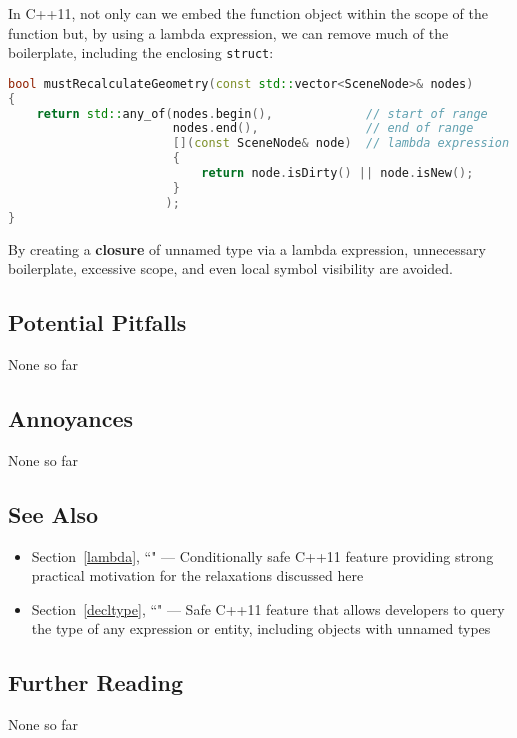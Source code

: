 \noindent In C++11, not only can we embed the function object within the scope of
the function but, by using a lambda expression, we can
remove much of the boilerplate, including the enclosing \texttt{struct}:

\begin{lstlisting}[language=C++]
bool mustRecalculateGeometry(const std::vector<SceneNode>& nodes)
{
    return std::any_of(nodes.begin(),             // start of range
                       nodes.end(),               // end of range
                       [](const SceneNode& node)  // lambda expression
                       {
                           return node.isDirty() || node.isNew();
                       }
                      );
}
\end{lstlisting}
    
\noindent By creating a \textbf{closure} of unnamed type via a lambda
expression, unnecessary boilerplate, excessive scope, and even local
symbol visibility are avoided.

\subsection[Potential Pitfalls]{Potential Pitfalls}\label{potential-pitfalls}

None so far

\subsection[Annoyances]{Annoyances}\label{annoyances}

None so far

\subsection[See Also]{See Also}\label{see-also}

\begin{itemize}
\item{Section~\ref{lambda}, ``" — Conditionally safe C++11 feature providing strong practical motivation for the relaxations discussed here}
\item{Section~\ref{decltype}, ``" — Safe C++11 feature that allows developers to query the type of any expression or entity, including objects with unnamed types}
\end{itemize}

\subsection[Further Reading]{Further Reading}\label{further-reading}

None so far



